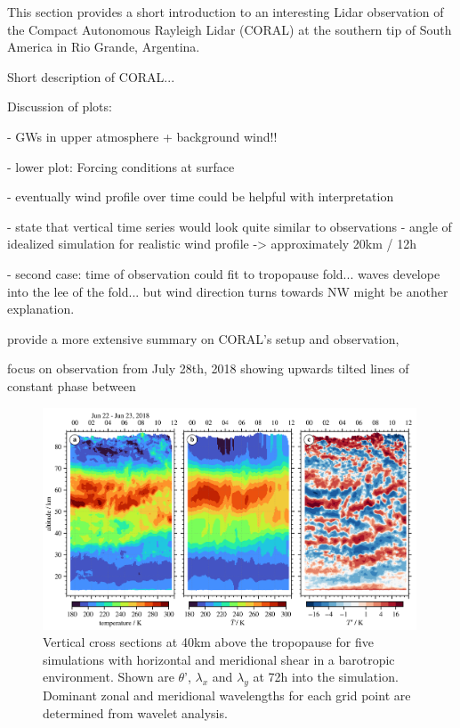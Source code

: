
This section provides a short introduction to an interesting Lidar observation of the Compact Autonomous Rayleigh Lidar (CORAL) at the southern tip of South America in Rio Grande, Argentina. 

Short description of CORAL...

Discussion of plots:

- GWs in upper atmosphere + background wind!!

- lower plot: Forcing conditions at surface 

- eventually wind profile over time could be helpful with interpretation

- state that vertical time series would look quite similar to observations - angle of idealized simulation for realistic wind profile -> approximately 20km / 12h 


- second case: time of observation could fit to tropopause fold... waves develope into the lee of the fold... but wind direction turns towards NW might be another explanation.

\textcite{kaifler_compact_2021} provide a more extensive summary on CORAL's setup and observation, 

focus on observation from July 28th, 2018 showing upwards tilted lines of constant phase between 

\begin{figure}[tbp]
    \centering
    \includegraphics[width=0.99\textwidth]{figures_lidar/coral_event_20180622.png}
    \caption{Vertical cross sections at 40km above the tropopause for five simulations with horizontal and meridional shear in a barotropic environment. Shown are $\theta$', $\lambda_x$ and $\lambda_y$ at 72h into the simulation. Dominant zonal and meridional wavelengths for each grid point are determined from wavelet analysis.}
\end{figure}


